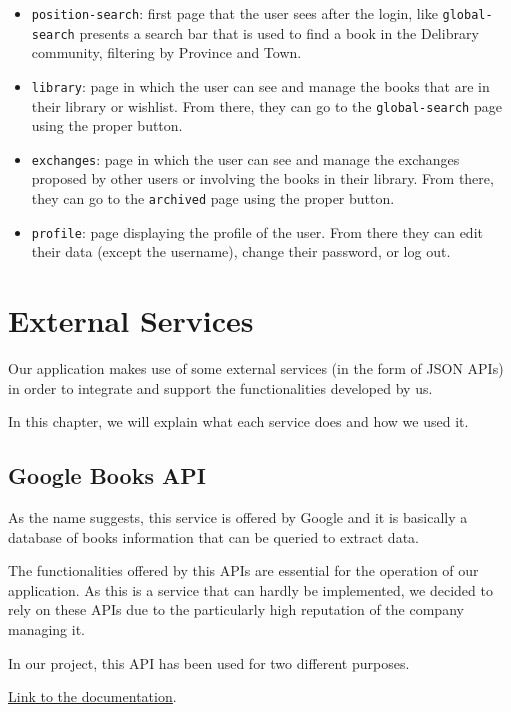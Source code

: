 \begin{itemize}
      \item \texttt{position-search}:
            first page that the user sees after the login, like \texttt{global-search} presents a search bar that is used to find a book
            in the Delibrary community, filtering by Province and Town.
      \item \texttt{library}:
            page in which the user can see and manage the books that are in their library or wishlist.
            From there, they can go to the \texttt{global-search} page using the proper button.
      \item \texttt{exchanges}:
            page in which the user can see and manage the exchanges proposed by other users or involving the books in their library.
            From there, they can go to the \texttt{archived} page using the proper button.
      \item \texttt{profile}:
            page displaying the profile of the user. From there they can edit their data (except the username), change their password, or log out.
\end{itemize}



\chapter{External Services}
Our application makes use of some external services (in the form of JSON APIs) in order to integrate and support the functionalities developed by us.

In this chapter, we will explain what each service does and how we used it.

\section{Google Books API}
As the name suggests, this service is offered by Google and it is basically a database of books information that can be queried to extract data.

The functionalities offered by this APIs are essential for the operation of our application.
As this is a service that can hardly be implemented, we decided to rely on these APIs due to the particularly high reputation of the company managing it.

In our project, this API has been used for two different purposes.

\underline{\href{https://developers.google.com/books}{Link to the documentation}}.

